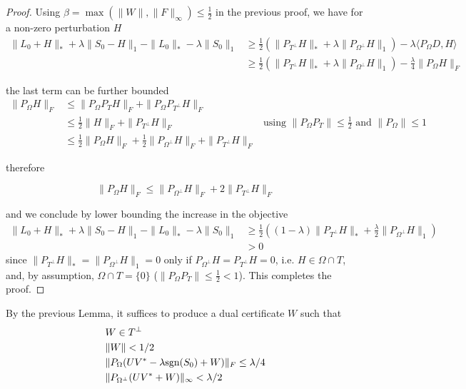 \begin{proof}
Using $\beta = \max (\|W\|, \|F\|_\infty) \leq \frac{1}{2}$ in the previous proof, we have for a non-zero perturbation $H$
\begin{align*}
\|L_0 + H\|_* + \lambda \|S_0 - H\|_1 - \|L_0\|_* - \lambda \|S_0 \|_1
&\geq  \frac{1}{2} \left( \|P_{T^\perp} H\|_* + \lambda \|P_{\Omega^\perp} H\|_1 \right) - \lambda \langle P_{\Omega} D, H\rangle \\
& \geq \frac{1}{2} \left( \|P_{T^\perp} H\|_* + \lambda \|P_{\Omega^\perp} H\|_1 \right) - \frac{\lambda}{4} \|P_{\Omega} H\|_F
\end{align*}

the last term can be further bounded
\begin{align*}
\|P_\Omega H\|_F
&\leq \|P_\Omega P_T H\|_F + \|P_\Omega P_{T^\perp} H\|_F \\
&\leq \frac{1}{2} \|H\|_F + \|P_{T^\perp} H\|_F & \text{using } \|P_\Omega P_T\| \leq \frac{1}{2} \text{ and } \|P_\Omega\| \leq 1 \\
&\leq \frac{1}{2} \|P_\Omega H\|_F + \frac{1}{2} \|P_{\Omega^\perp} H\|_F + \|P_{T^\perp} H\|_F
\end{align*}

therefore

\[
\|P_\Omega H\|_F \leq \|P_{\Omega^\perp} H\|_F + 2 \|P_{T^\perp} H\|_F
\]

and we conclude by lower bounding the increase in the objective
\begin{align*}
\|L_0 + H\|_* + \lambda \|S_0 - H\|_1 - \|L_0\|_* - \lambda \|S_0 \|_1
&\geq  \frac{1}{2} \left( (1- \lambda) \|P_{T^\perp} H\|_* + \frac{\lambda}{2} \|P_{\Omega^\perp} H\|_1 \right) \\
& > 0
\end{align*}
since $ \|P_{T^\perp} H\|_* =  \|P_{\Omega^\perp} H\|_1 = 0$ only if $P_{\Omega^\perp} H = P_{T^\perp} H = 0$, i.e. $H \in \Omega \cap T$, and, by assumption, $\Omega \cap T = \{ 0 \}$ ($\|P_\Omega P_T\| \leq \frac{1}{2} < 1$).
This completes the proof.

\end{proof}

\iffalse
By the previous Lemma, it suffices to produce a dual certificate $W$ such that
\begin{equation}
\begin{aligned}
& W \in T^{\perp} \\
& \|W\| < 1/2\\
& \|P_\Omega (UV^* - \lambda \text{sgn}(S_0) + W) \|_F \leq \lambda / 4  \\
& \|P_{\Omega^\perp}(UV^* + W)\|_\infty < \lambda / 2
\end{aligned}
\end{equation}

